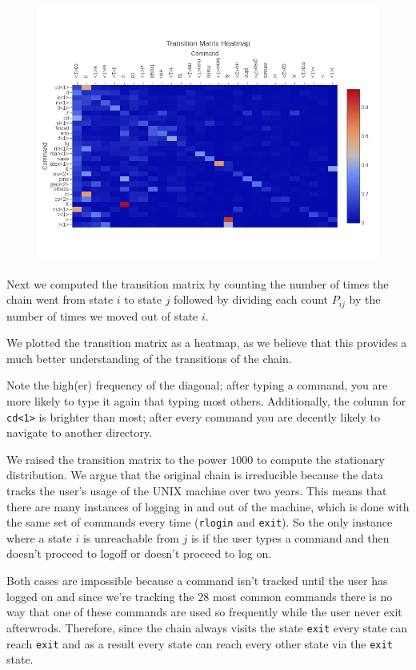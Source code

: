 \documentclass[10pt]{article}
\begin{document}
\begin{figure}[!htb]
  \centering
  \includegraphics[scale=.60]{../pictures/transition-matrix-heatmap.png}
\end{figure}

Next we computed the transition matrix by counting the number of times the chain
went from state $i$ to state $j$ followed by dividing each count $P_{ij}$ by the
number of times we moved out of state $i$. 

We plotted the transition matrix as a heatmap, as we believe that this provides a much better understanding of the transitions of the chain. 

Note the high(er) frequency of the diagonal; after typing a command, you are more likely to type it again that typing most others.
Additionally, the column for \texttt{cd<1>} is brighter than most; after every command you are decently likely to navigate to another directory. 

We raised the transition matrix to the power $1000$ to compute the stationary
distribution. We argue that the original chain is irreducible because the data tracks the
user's usage of the UNIX machine over two years. This means that there are many
instances of logging in and out of the machine, which is done with the same set
of commands every time (\texttt{rlogin} and \texttt{exit}). So the only instance
where a state $i$ is unreachable from $j$ is if the user types a command and
then doesn't proceed to logoff or doesn't proceed to log on.

Both cases are impossible because a command isn't tracked until the user has logged on and
since we're tracking the $28$ most common commands there is no way that one of
these commands are used so frequently while the user never exit afterwrods.
Therefore, since the chain always visits the state \texttt{exit} every state can
reach \texttt{exit} and as a result every state can reach every other state via
the \texttt{exit} state.
\end{document}
